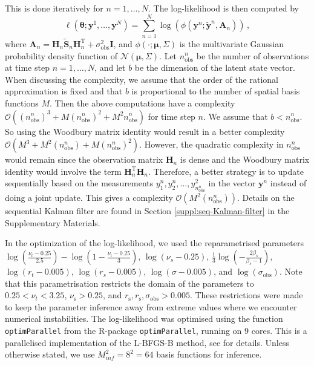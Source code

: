 \documentclass[12pt]{article} %
\begin{document}
This is done iteratively for $n = 1, \ldots, N$. The log-likelihood is then computed by
\begin{equation*}
    \ell(\boldsymbol{\theta}; \boldsymbol{y}^1, \ldots, \boldsymbol{y}^N) = \sum_{n = 1}^{N} \log(\phi(\mathbf{y}^n; \tilde{\mathbf{y}}^n, \mathbf{A}_n)) \, ,
\end{equation*}
where $\mathbf{A}_n=\mathbf{H}_n\tilde{\mathbf{S}}_n\mathbf{H}_n^\mathrm{T}+\sigma_{\mathrm{obs}}^2\mathbf{I}$, and $\phi(\cdot; \boldsymbol{\mu}, \Sigma)$ is the multivariate Gaussian probability density function of $\mathcal{N}(\boldsymbol{\mu}, \Sigma)$. Let $n_{\mathrm{obs}}^n$ be the number of observations at time step $n = 1, \ldots, N$, and let $b$ be the dimension of the latent state vector. When discussing the complexity, we assume that the order of the rational approximation is fixed and that $b$ is proportional to the number of spatial basis functions $M$. Then the above computations have a complexity $\mathcal{O}((n_{\mathrm{obs}}^n)^3+M(n_{\mathrm{obs}}^n)^2+ M^2n_{\mathrm{obs}}^n)$ for time step $n$. We assume that $b < n_{\mathrm{obs}}^n$. So using the Woodbury matrix identity would result in a better complexity $\mathcal{O}(M^3+M^2(n_{\mathrm{obs}}^n)+ M(n_{\mathrm{obs}}^n)^2)$. However, the quadratic complexity in $n_{\mathrm{obs}}^n$ would remain since the observation matrix $\mathbf{H}_n$ is dense and the Woodbury matrix identity would involve the term $\mathbf{H}_n^\mathrm{T}\mathbf{H}_n$. Therefore, a better strategy is to update sequentially based on the measurements $y_1^n, y_2^n, \ldots, y_{n_{\mathrm{obs}}^n}^2$ in the vector $\boldsymbol{y}^n$ instead of doing a joint update. This gives a complexity $\mathcal{O}(M^2(n_{\mathrm{obs}}^n))$. Details on the sequential Kalman filter are found in Section \ref{suppl:seq-Kalman-filter} in the Supplementary Materials. 

In the optimization of the log-likelihood, we used the reparametrised parameters $\log(\frac{\nu_t - 0.25}{2.5}) - \log(1 - \frac{\nu_t - 0.25}{3})$, $\log(\nu_s - 0.25)$, $\frac{1}{3}\log( -\frac{2\beta_s}{\beta_s - 1})$, $\log(r_t - 0.005)$, $\log(r_s - 0.005)$, $\log(\sigma - 0.005)$, and $\log(\sigma_{\mathrm{obs}})$. Note that this parametrisation restricts the domain of the parameters to $0.25 < \nu_t < 3.25$, $\nu_\mathrm{s}>0.25$, and $r_\mathrm{s}, r_\mathrm{s}, \sigma_{\mathrm{obs}}>0.005$. These restrictions were made to keep the parameter inference away from extreme values where we encounter numerical instabilities. The log-likelihood was optimised using the function \texttt{optimParallel} from the \textsf{R}-package \texttt{optimParallel}, running on $9$ cores. This is a parallelised implementation of the L-BFGS-B method, see \cite{Gerber2018} for details. Unless otherwise stated, we use $M_{inf}^2 = 8^2 = 64$ basis functions for inference.
\end{document}
